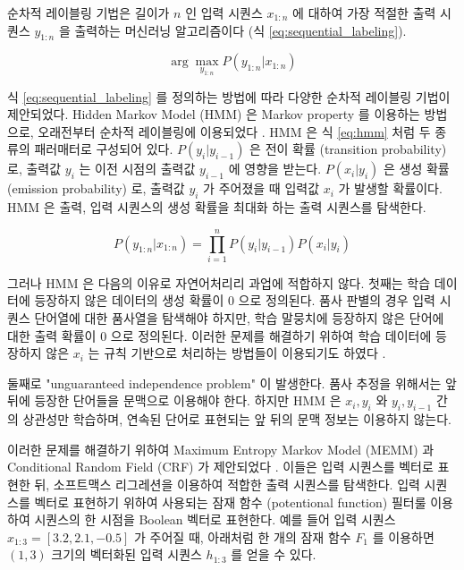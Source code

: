 \documentclass[oneside, ko,phd]{snuthesis_utf8_kor}
\begin{document}
순차적 레이블링 기법은 길이가 $n$ 인 입력 시퀀스 $x_{1:n}$ 에 대하여 가장 적절한 출력 시퀀스 $y_{1:n}$ 을 출력하는 머신러닝 알고리즘이다 (식 \ref{eq:sequential_labeling}).

\begin{equation}
  \label{eq:sequential_labeling}
  \arg \max_{y_{1:n}} P(y_{1:n} \vert x_{1:n})
\end{equation}

식 \ref{eq:sequential_labeling} 를 정의하는 방법에 따라 다양한 순차적 레이블링 기법이 제안되었다.
Hidden Markov Model (HMM) 은 Markov property 를 이용하는 방법으로, 오래전부터 순차적 레이블링에 이용되었다 \cite{krogh1994hidden}.
HMM 은 식 \ref{eq:hmm} 처럼 두 종류의 패러매터로 구성되어 있다.
$P(y_i \vert y_{i-1})$ 은 전이 확률 (transition probability) 로, 출력값 $y_i$ 는 이전 시점의 출력값 $y_{i-1}$ 에 영향을 받는다.
$P(x_i \vert y_i)$ 은 생성 확률 (emission probability) 로, 출력값 $y_i$ 가 주어졌을 때 입력값 $x_i$ 가 발생할 확률이다.
HMM 은 출력, 입력 시퀀스의 생성 확률을 최대화 하는 출력 시퀀스를 탐색한다.

\begin{equation}
  \label{eq:hmm}
  P(y_{1:n} \vert x_{1:n}) = \prod_{i=1}^{n} P(y_i \vert y_{i-1}) P(x_i \vert y_i)
\end{equation}

그러나 HMM 은 다음의 이유로 자연어처리리 과업에 적합하지 않다.
첫째는 학습 데이터에 등장하지 않은 데이터의 생성 확률이 0 으로 정의된다.
품사 판별의 경우 입력 시퀀스 단어열에 대한 품사열을 탐색해야 하지만, 학습 말뭉치에 등장하지 않은 단어에 대한 출력 확률이 0 으로 정의된다.
이러한 문제를 해결하기 위하여 학습 데이터에 등장하지 않은 $x_i$ 는 규칙 기반으로 처리하는 방법들이 이용되기도 하였다 \cite{brants2000tnt}.

둘째로 "unguaranteed independence problem" 이 발생한다.
품사 추정을 위해서는 앞 뒤에 등장한 단어들을 문맥으로 이용해야 한다.
하지만 HMM 은 $x_i, y_i$ 와 $y_i, y_{i-1}$ 간의 상관성만 학습하며, 연속된 단어로 표현되는 앞 뒤의 문맥 정보는 이용하지 않는다.

이러한 문제를 해결하기 위하여 Maximum Entropy Markov Model (MEMM) 과 Conditional Random Field (CRF) 가 제안되었다 \cite{mccallum2000maximum, lafferty2001conditional}.
이들은 입력 시퀀스를 벡터로 표현한 뒤, 소프트맥스 리그레션을 이용하여 적합한 출력 시퀀스를 탐색한다.
입력 시퀀스를 벡터로 표현하기 위하여 사용되는 잠재 함수 (potentional function) 필터룰 이용하여 시퀀스의 한 시점을 Boolean 벡터로 표현한다.
예를 들어 입력 시퀀스 $x_{1:3}=[3.2, 2.1, -0.5]$ 가 주어질 때, 아래처럼 한 개의 잠재 함수 $F_1$ 를 이용하면 $(1, 3)$ 크기의 벡터화된 입력 시퀀스 $h_{1:3}$ 를 얻을 수 있다.
\end{document}
